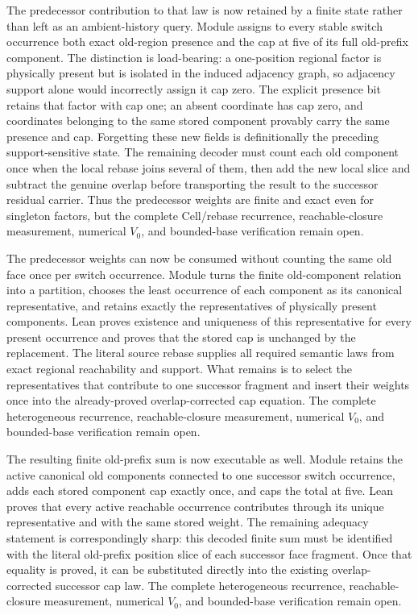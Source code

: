 \documentclass[11pt]{article}
\theoremstyle{definition}
\begin{document}
The predecessor contribution to that law is now retained by a finite state
rather than left as an ambient-history query.  Module
assigns to every stable switch occurrence both exact old-region presence and
the cap at five of its full old-prefix component.  The distinction is
load-bearing: a one-position regional factor is physically present but is
isolated in the induced adjacency graph, so adjacency support alone would
incorrectly assign it cap zero.  The explicit presence bit retains that factor
with cap one; an absent coordinate has cap zero, and coordinates belonging to
the same stored component provably carry the same presence and cap.  Forgetting
these new fields is definitionally the preceding support-sensitive state.  The
remaining decoder must count each old component once when the local rebase
joins several of them, then add the new local slice and subtract the genuine
overlap before transporting the result to the successor residual carrier.
Thus the predecessor weights are finite and exact even for singleton factors,
but the complete Cell/rebase recurrence, reachable-closure measurement,
numerical $V_0$, and bounded-base verification remain open.

The predecessor weights can now be consumed without counting the same old
face once per switch occurrence.  Module
turns the finite old-component relation into a partition, chooses the least
occurrence of each component as its canonical representative, and retains
exactly the representatives of physically present components.  Lean proves
existence and uniqueness of this representative for every present occurrence
and proves that the stored cap is unchanged by the replacement.  The literal
source rebase supplies all required semantic laws from exact regional
reachability and support.  What remains is to select the representatives that
contribute to one successor fragment and insert their weights once into the
already-proved overlap-corrected cap equation.  The complete heterogeneous
recurrence, reachable-closure measurement, numerical $V_0$, and bounded-base
verification remain open.

The resulting finite old-prefix sum is now executable as well.  Module
retains the active canonical old components connected to one successor switch
occurrence, adds each stored component cap exactly once, and caps the total at
five.  Lean proves that every active reachable occurrence contributes through
its unique representative and with the same stored weight.  The remaining
adequacy statement is correspondingly sharp: this decoded finite sum must be
identified with the literal old-prefix position slice of each successor face
fragment.  Once that equality is proved, it can be substituted directly into
the existing overlap-corrected successor cap law.  The complete heterogeneous
recurrence, reachable-closure measurement, numerical $V_0$, and bounded-base
verification remain open.
\end{document}

